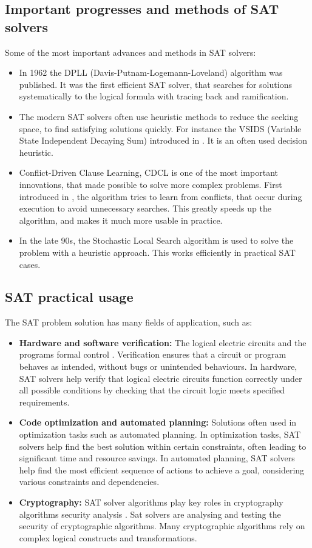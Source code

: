 \documentclass{article}
\begin{document}
\subsection{Important progresses and methods of SAT solvers}
Some of the most important advances and methods in SAT solvers:
\begin{itemize}
    \item In 1962 the DPLL (Davis-Putnam-Logemann-Loveland) algorithm was published. It was the first efficient SAT solver, that searches for solutions systematically to the logical formula with tracing back and ramification.
    \item The modern SAT solvers often use heuristic methods to reduce the seeking space, to find satisfying solutions quickly. For instance the VSIDS (Variable State Independent Decaying Sum) introduced in \cite{VSIDS}. It is an often used decision heuristic.
    \item Conflict-Driven Clause Learning, CDCL is one of the most important innovations, that made possible to solve more complex problems. First introduced in \cite{CDCL}, the algorithm tries to learn from conflicts, that occur during execution to avoid unnecessary searches. This greatly speeds up the algorithm, and makes it much more usable in practice.
    \item In the late 90s, the Stochastic Local Search algorithm is used to solve the problem with a heuristic approach. This works efficiently in practical SAT cases.
\end{itemize}

\subsection{SAT practical usage}
\label{subsec:practicaluse}
The SAT problem solution has many fields of application, such as:
\begin{itemize}
    \item \textbf{Hardware and software verification:} The logical electric circuits and the programs formal control \cite{c32SAT}. Verification ensures that a circuit or program behaves as intended, without bugs or unintended behaviours. In hardware, SAT solvers help verify that logical electric circuits function correctly under all possible conditions by checking that the circuit logic meets specified requirements.
    \item \textbf{Code optimization and automated planning:} Solutions often used in optimization tasks such as automated planning. In optimization tasks, SAT solvers help find the best solution within certain constraints, often leading to significant time and resource savings. In automated planning, SAT solvers help find the most efficient sequence of actions to achieve a goal, considering various constraints and dependencies.
    \item \textbf{Cryptography:} SAT solver algorithms play key roles in cryptography algorithms security analysis \cite{SATInCrypto}. Sat solvers are analysing and testing the security of cryptographic algorithms. Many cryptographic algorithms rely on complex logical constructs and transformations.
\end{itemize}
\end{document}
